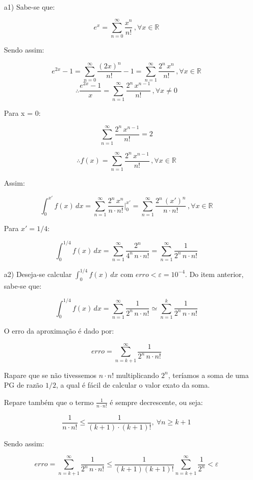\documentclass[12pt,a4paper]{article}
\begin{document}
 \\

\begin{itemize}
\item[a1)] Sabe-se que:

$$ e^x  = \sum_{n=0}^\infty \frac{x^n}{n!} \, , \forall x \in \mathbb{R}$$

Sendo assim:

$$ e^{2x} - 1 = \sum_{n=0}^\infty \frac{(2x)^n}{n!} - 1 =  \sum_{n=1}^\infty \frac{2^n \, x^n}{n!} \, , \forall x \in \mathbb{R} $$
$$ \therefore \frac{e^{2x} - 1}{x} = \sum_{n=1}^\infty \frac{2^n \, x^{n-1}}{n!} \, , \forall x \neq 0 $$

Para x = 0:

$$ \sum_{n=1}^\infty \frac{2^n \, x^{n-1}}{n!} = 2 $$

$$ \therefore f(x) = \sum_{n=1}^\infty \frac{2^n \, x^{n-1}}{n!} \, , \forall x \in \mathbb{R} $$

Assim:

$$ \int_{0}^{x'} f(x) \, dx = \sum_{n=1}^\infty \frac{2^n \, x^{n}}{n \cdot n!} \Big|_{0}^{x'} = \sum_{n=1}^\infty \frac{2^n \, (x')^{n}}{n \cdot n!} \, , \forall x \in \mathbb{R} $$

Para $ x' = 1/4$:

$$ \int_{0}^{1/4} f(x) \, dx =  \sum_{n=1}^\infty \frac{2^n}{ 4^n \, n \cdot n!} = \sum_{n=1}^\infty \frac{1}{ 2^n \, n \cdot n!} $$

\item[a2)] Deseja-se calcular $ \displaystyle\int_{0}^{1/4} f(x) \, dx$ com $erro < \varepsilon = 10^{-4}$. Do item anterior, sabe-se que:

$$ \int_{0}^{1/4} f(x) \, dx = \sum_{n=1}^\infty \frac{1}{ 2^n \, n \cdot n!} \simeq \sum_{n=1}^k \frac{1}{ 2^n \, n \cdot n!}  $$

O erro da aproximação é dado por:

$$ erro = \sum_{n=k+1}^\infty \frac{1}{ 2^n \, n \cdot n!} $$

Rapare que se não tivessemos $ n \cdot n!$ multiplicando $2^n$, teríamos a soma de uma PG de razão $1/2$, a qual é fácil de calcular o valor exato da soma.

Repare também que o termo $ \frac{1}{n \cdot n!} $ é sempre decrescente, ou seja:

$$ \frac{1}{n \cdot n!} \leq \frac{1}{ (k+1) \cdot (k+1)!} ,\ \forall n \geq k+1 $$

Sendo assim:

$$ erro = \sum_{n=k+1}^\infty \frac{1}{ 2^n \, n \cdot n!} \leq \frac{1}{(k+1)(k+1)!} \sum_{n=k+1}^\infty \frac{1}{ 2^n} < \varepsilon $$


\end{itemize}
\end{document}
